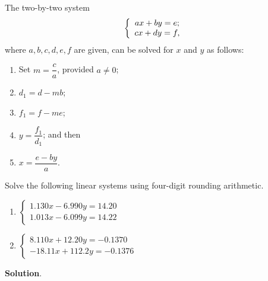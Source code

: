 \documentclass[11pt]{article}
\theoremstyle{break}
\numberwithin{equation}{theorem}
\begin{document}
\newpage
\begin{problem}\label{problem 8}
    The two-by-two system \vspace{-0.6em}
    \begin{equation*}
        \left\{
            \begin{array}{c}
                ax+by=e;\\
                cx+dy=f,
            \end{array}
        \right. \vspace{-0.6em}
    \end{equation*}
    where $a, b, c, d, e, f$ are given, can be solved for $x$ and $y$ as follows:
    \begin{enumerate}[label=\arabic*.]
        \item Set $m=\dfrac{c}{a}$, provided $a\ne 0$;
        \item $d_1=d-mb$;
        \item $f_1=f-me$;
        \item $y=\dfrac{f_1}{d_1}$; and then
        \item $x=\dfrac{e-by}{a}$.
    \end{enumerate}
    Solve the following linear systems using four-digit rounding arithmetic.
    \begin{enumerate}
        \item $\displaystyle\left\{
            \begin{array}{c}
                1.130x-6.990y=14.20\\
                1.013x-6.099y=14.22
            \end{array}
        \right.$
        \item $\displaystyle\left\{
            \begin{array}{r}
                8.110x+12.20y=-0.1370\\
                -18.11x+112.2y=-0.1376
            \end{array}
        \right.$
    \end{enumerate}
\end{problem}
\textbf{Solution}.
\end{document}
